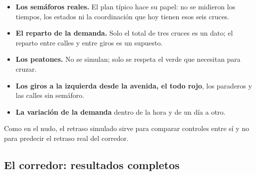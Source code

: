 \begin{itemize}
  \item \textbf{Los semáforos reales.} El plan típico hace su papel: no
    se midieron los tiempos, los estados ni la coordinación que hoy
    tienen esos seis cruces.
  \item \textbf{El reparto de la demanda.} Solo el total de tres cruces
    es un dato; el reparto entre calles y entre giros es un supuesto.
  \item \textbf{Los peatones.} No se simulan; solo se respeta el verde
    que necesitan para cruzar.
  \item \textbf{Los giros a la izquierda desde la avenida, el todo
    rojo}, los paraderos y las calles sin semáforo.
  \item \textbf{La variación de la demanda} dentro de la hora y de un
    día a otro.
\end{itemize}
Como en el nudo, el retraso simulado sirve para comparar controles
entre sí y no para predecir el retraso real del corredor.

\subsection*{El corredor: resultados completos}

